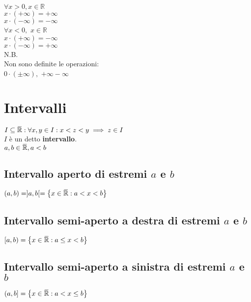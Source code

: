 \documentclass[a4paper, twoside, italian, 11pt]{book}
\newcommand{\braces}[1] {\left \{ #1 \right \}}
\newcommand{\overbar}[1] {\mkern 1.5mu\overline{\mkern-1.5mu#1\mkern-1.5mu}\mkern 1.5mu}
\newcommand{\R}{\mathbb{R}}
\begin{document}
\noindent
$\forall x > 0, x \in \R$ \\
$x \cdot (+\infty) = +\infty$ \\
$x \cdot (-\infty) = -\infty$ \\


\noindent
$\forall x < 0,$ $x \in \R$ \\
$x \cdot (+\infty) = -\infty$ \\
$x \cdot (-\infty) = +\infty$ \\

\noindent
N.B. \\
Non sono definite le operazioni: \\
$0 \cdot (\pm \infty),$ $+ \infty - \infty$



\section{Intervalli}

\noindent
$I \subseteq \overbar\R : \forall x, y \in I : x < z < y \implies z \in I$ \\
$I$ è un detto \textbf{intervallo}. \\

\noindent
$a, b \in \overbar\R, a < b$ \\


\subsection{Intervallo aperto di estremi $a$ e $b$}

\noindent
$(a, b) = ]a, b[ = \braces{ x \in \overbar\R : a < x < b}$ \\


\subsection{Intervallo semi-aperto a destra di estremi $a$ e $b$}

\noindent
$[a, b) = \braces{ x \in \overbar\R : a \leq x < b}$ \\


\subsection{Intervallo semi-aperto a sinistra di estremi $a$ e $b$}

\noindent
$(a, b] = \braces{ x \in \overbar\R : a < x \leq b}$ \\
\end{document}
